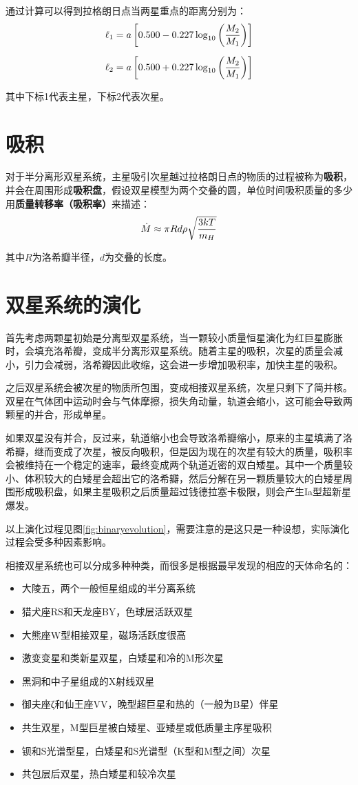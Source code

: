 \documentclass[openany]{ctexbook}
\begin{document}
通过计算可以得到拉格朗日点当两星重点的距离分别为：
\begin{align}
  \ell_1 &=a\left[0.500-0.227\log_{10}\left({M_2\over M_1}\right)\right]\\[2mm]
  \ell_2 &=a\left[0.500+0.227\log_{10}\left({M_2\over M_1}\right)\right]
\end{align}

其中下标1代表主星，下标2代表次星。

\section{吸积}
对于半分离形双星系统，主星吸引次星越过拉格朗日点的物质的过程被称为\textbf{吸积}，并会在周围形成\textbf{吸积盘}，假设双星模型为两个交叠的圆，单位时间吸积质量的多少用\textbf{质量转移率（吸积率）}来描述：
\begin{equation}
  \dot M\approx \pi Rd\rho \sqrt{3kT\over m_H}
\end{equation}

其中$R$为洛希瓣半径，$d$为交叠的长度。

\section{双星系统的演化}
首先考虑两颗星初始是分离型双星系统，当一颗较小质量恒星演化为红巨星膨胀时，会填充洛希瓣，变成半分离形双星系统。随着主星的吸积，次星的质量会减小，引力会减弱，洛希瓣因此收缩，这会进一步增加吸积率，加快主星的吸积。

之后双星系统会被次星的物质所包围，变成相接双星系统，次星只剩下了简并核。双星在气体团中运动时会与气体摩擦，损失角动量，轨道会缩小，这可能会导致两颗星的并合，形成单星。

如果双星没有并合，反过来，轨道缩小也会导致洛希瓣缩小，原来的主星填满了洛希瓣，继而变成了次星，被反向吸积，但是因为现在的次星有较大的质量，吸积率会被维持在一个稳定的速率，最终变成两个轨道近密的双白矮星。其中一个质量较小、体积较大的白矮星会超出它的洛希瓣，然后分解在另一颗质量较大的白矮星周围形成吸积盘，如果主星吸积之后质量超过钱德拉塞卡极限，则会产生Ia型超新星爆发。

以上演化过程见图\ref{fig:binaryevolution}，需要注意的是这只是一种设想，实际演化过程会受多种因素影响。

相接双星系统也可以分成多种种类，而很多是根据最早发现的相应的天体命名的：
\begin{itemize}
  \item 大陵五，两个一般恒星组成的半分离系统
  \item 猎犬座RS和天龙座BY，色球层活跃双星
  \item 大熊座W型相接双星，磁场活跃度很高
  \item 激变变星和类新星双星，白矮星和冷的M形次星
  \item 黑洞和中子星组成的X射线双星
  \item 御夫座ζ和仙王座VV，晚型超巨星和热的（一般为B星）伴星
  \item 共生双星，M型巨星被白矮星、亚矮星或低质量主序星吸积
  \item 钡和S光谱型星，白矮星和S光谱型（K型和M型之间）次星
  \item 共包层后双星，热白矮星和较冷次星
\end{itemize}
\end{document}
